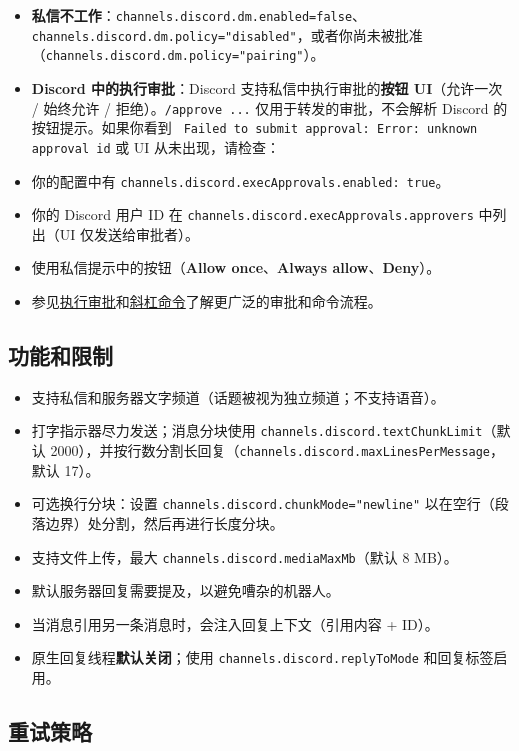 \begin{itemize}
  \item \textbf{私信不工作}：\texttt{channels.discord.dm.enabled=false}、\texttt{channels.discord.dm.policy="disabled"}，或者你尚未被批准（\texttt{channels.discord.dm.policy="pairing"}）。
  \item \textbf{Discord 中的执行审批}：Discord 支持私信中执行审批的\textbf{按钮 UI}（允许一次 / 始终允许 / 拒绝）。\texttt{/approve  ...} 仅用于转发的审批，不会解析 Discord 的按钮提示。如果你看到 \texttt{ Failed to submit approval: Error: unknown approval id} 或 UI 从未出现，请检查：
  \item 你的配置中有 \texttt{channels.discord.execApprovals.enabled: true}。
  \item 你的 Discord 用户 ID 在 \texttt{channels.discord.execApprovals.approvers} 中列出（UI 仅发送给审批者）。
  \item 使用私信提示中的按钮（\textbf{Allow once}、\textbf{Always allow}、\textbf{Deny}）。
  \item 参见\href{/tools/exec-approvals}{执行审批}和\href{/tools/slash-commands}{斜杠命令}了解更广泛的审批和命令流程。
\end{itemize}


\subsection{功能和限制}


\begin{itemize}
  \item 支持私信和服务器文字频道（话题被视为独立频道；不支持语音）。
  \item 打字指示器尽力发送；消息分块使用 \texttt{channels.discord.textChunkLimit}（默认 2000），并按行数分割长回复（\texttt{channels.discord.maxLinesPerMessage}，默认 17）。
  \item 可选换行分块：设置 \texttt{channels.discord.chunkMode="newline"} 以在空行（段落边界）处分割，然后再进行长度分块。
  \item 支持文件上传，最大 \texttt{channels.discord.mediaMaxMb}（默认 8 MB）。
  \item 默认服务器回复需要提及，以避免嘈杂的机器人。
  \item 当消息引用另一条消息时，会注入回复上下文（引用内容 + ID）。
  \item 原生回复线程\textbf{默认关闭}；使用 \texttt{channels.discord.replyToMode} 和回复标签启用。
\end{itemize}


\subsection{重试策略}


